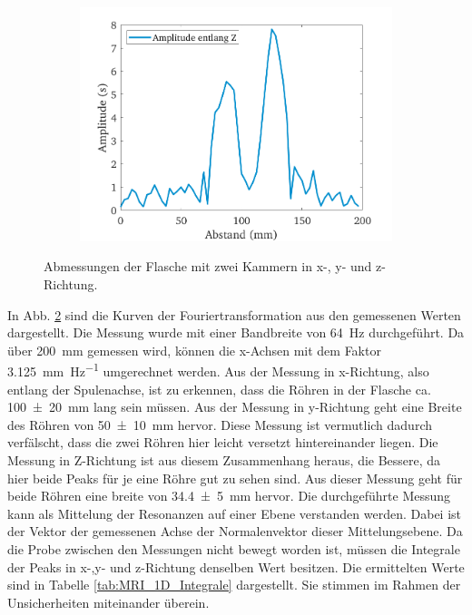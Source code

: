 \documentclass[../../main.tex]{subfiles}
\begin{document}
\begin{figure}[H]
\begin{subfigure}[c]{0.5\textwidth}
                \includegraphics[width=\linewidth]{Bilddateien/12/Z/Fig_1}
                \label{fig:MRI_1D_Z}
            \end{subfigure}
            \caption{Abmessungen der Flasche mit zwei Kammern in x-, y- und z-Richtung.}
            \label{fig:MRI_1D}
        \end{figure} 
        In Abb. \ref{fig:MRI_1D} sind die Kurven der Fouriertransformation aus den gemessenen Werten dargestellt. Die Messung wurde mit einer Bandbreite von \SI{64}{\hertz} durchgeführt. Da über \SI{200}{\milli \metre} gemessen wird, können die x-Achsen mit dem Faktor \SI{3,125}{\milli \metre \per \hertz} umgerechnet werden. Aus der Messung in x-Richtung, also entlang der Spulenachse, ist zu erkennen, dass die Röhren in der Flasche ca. \SI{100 +- 20}{\milli \metre} lang sein müssen. Aus der Messung in y-Richtung geht eine Breite des Röhren von \SI{50 +- 10}{\milli \metre} hervor. Diese Messung ist vermutlich dadurch verfälscht, dass die zwei Röhren hier leicht versetzt hintereinander liegen. Die Messung in Z-Richtung ist aus diesem Zusammenhang heraus, die Bessere, da hier beide Peaks für je eine Röhre gut zu sehen sind. Aus dieser Messung geht für beide Röhren eine breite von \SI{34,4 +- 5}{\milli \metre} hervor. Die durchgeführte Messung kann als Mittelung der Resonanzen auf einer Ebene verstanden werden. Dabei ist der Vektor der gemessenen Achse der Normalenvektor dieser \glqq{}Mittelungsebene\grqq{}. Da die Probe zwischen den Messungen nicht bewegt worden ist, müssen die Integrale der Peaks in x-,y- und z-Richtung denselben Wert besitzen. Die ermittelten Werte sind in Tabelle \ref{tab:MRI_1D_Integrale} dargestellt. Sie stimmen im Rahmen der Unsicherheiten miteinander überein.
\end{document}
